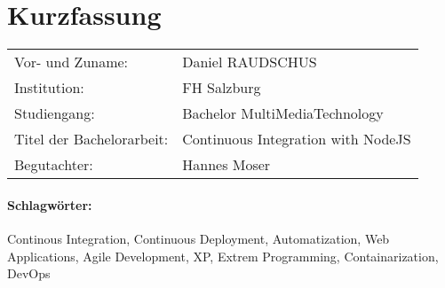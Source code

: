 \section*{Kurzfassung}
\begin{tabular}{l l}
Vor- und Zuname:& Daniel RAUDSCHUS\\
Institution: & FH Salzburg\\
Studiengang: &  Bachelor MultiMediaTechnology\\
Titel der Bachelorarbeit: & Continuous Integration with NodeJS\\
Begutachter: & Hannes Moser\\
\end{tabular}
\vspace{0.5cm}

\paragraph{Schlagwörter:}
Continous Integration, Continuous Deployment, Automatization, Web Applications, Agile Development, XP, Extrem Programming, Containarization, DevOps
